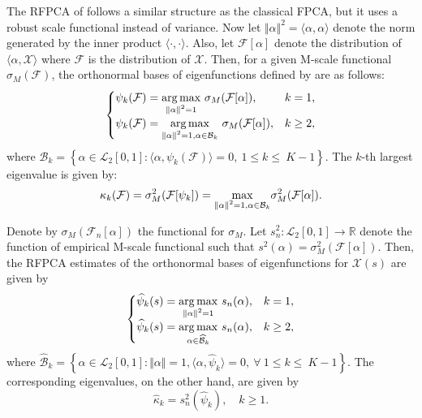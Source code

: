The RFPCA of \cite{Bali2011} follows a similar structure as the classical FPCA, but it uses a robust scale functional instead of variance. Now let $\Vert \alpha \Vert^2 = \langle \alpha, \alpha \rangle$ denote the norm generated by the inner product $\langle \cdot, \cdot \rangle$. Also, let $\mathcal{F}[\alpha]$ denote the distribution of $\langle \alpha, \mathcal{X} \rangle$ where $\mathcal{F}$ is the distribution of $\mathcal{X}$. Then, for a given M-scale functional $\sigma_M(\mathcal{F})$, the orthonormal bases of eigenfunctions defined by \cite{Bali2011} are as follows:
\[ \begin{cases}
\psi_k(\mathcal{F}) = \underset{\begin{subarray}{c}
      \Vert \alpha \Vert^2 = 1
\end{subarray}}{\arg \max}~ \sigma_M(\mathcal{F}[\alpha]), & k = 1, \\
\psi_k(\mathcal{F}) = \underset{\begin{subarray}{c}
      \Vert \alpha \Vert^2 = 1, \alpha \in \mathcal{B}_k
\end{subarray}}{\arg \max}~ \sigma_M(\mathcal{F}[\alpha]), & k \geq 2,
   \end{cases}
\]
where $\mathcal{B}_k = \left\lbrace \alpha \in \mathcal{L}_2[0,1]: \langle \alpha, \psi_k ( \mathcal{F} ) \rangle = 0, ~ 1 \leq k \leq \ K - 1 \right\rbrace$. The $k$-th largest eigenvalue is given by:
\begin{equation*}
\kappa_k(\mathcal{F}) = \sigma_M^2(\mathcal{F}[\psi_k]) = \underset{\begin{subarray}{c}
      \Vert \alpha \Vert^2 = 1, \alpha \in \mathcal{B}_k
\end{subarray}}{\max} \sigma_M^2(\mathcal{F}[\alpha]).
\end{equation*}

Denote by $\sigma_M(\mathcal{F}_n[\alpha])$ the functional for $\sigma_M$. Let $s^2_n: \mathcal{L}_2[0,1] \rightarrow \mathbb{R}$ denote the function of empirical M-scale functional such that $s^2(\alpha) = \sigma_M^2(\mathcal{F}[\alpha])$. Then, the RFPCA estimates of the orthonormal bases of eigenfunctions for $\mathcal{X}(s)$ are given by
\[ \begin{cases}
\widehat{\psi}_k(s) = \underset{\begin{subarray}{c}
      \Vert \alpha \Vert^2 = 1
\end{subarray}}{\arg \max}~ s_n(\alpha), & k = 1, \\
\widehat{\psi}_k(s) = \underset{\begin{subarray}{c}
      \alpha \in \widehat{\mathcal{B}}_k
\end{subarray}}{\arg \max}~ s_n(\alpha), & k \geq 2,
   \end{cases}
\]
where $\widehat{\mathcal{B}}_k = \left\lbrace \alpha \in \mathcal{L}_2 [0,1]: \Vert \alpha \Vert = 1, \langle \alpha, \widehat{\psi}_k \rangle = 0, ~ \forall~ 1 \leq k \leq \ K - 1 \right\rbrace$. The corresponding eigenvalues, on the other hand, are given by
\begin{equation*}
\widehat{\kappa}_k = s^2_n (\widehat{\psi}_k), \quad k \geq 1.
\end{equation*}


